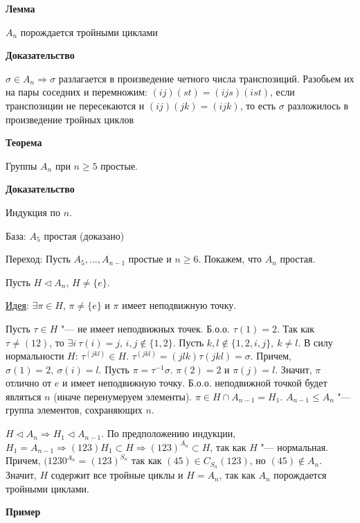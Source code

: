 \documentclass{article}
\begin{document}
\vspace{10pt}

\textbf{Лемма}

$A_n$ порождается тройными циклами  

\textbf{Доказательство}

$\sigma \in A_n \Rightarrow \sigma$ разлагается в произведение четного числа транспозиций. Разобьем их на пары соседних и перемножим: $(i j)(s t) = (i j s)(i s t)$, если транспозиции не пересекаются и $(i j)(j k) = (i j k)$, то есть $\sigma$ разложилось в произведение тройных циклов

\vspace{10pt}

\textbf{Теорема}

Группы $A_n$ при $n \geq 5$ простые.

\textbf{Доказательство}

Индукция по $n$.

База: $A_5$ простая (доказано)

Переход: Пусть $A_5, ..., A_{n-1}$ простые и $n \geq 6$. Покажем, что $A_n$ простая.

Пусть $H \triangleleft A_n$, $H \neq \{e\}$.

\underline{Идея}: $\exists \pi \in H$, $\pi \neq \{e\}$ и $\pi$ имеет неподвижную точку.

Пусть $\tau \in H$ "--- не имеет неподвижных точек. Б.о.о. $\tau(1) = 2$. Так как $\tau \neq (1 2)$, то $\exists i \  \tau(i) = j$, $i, j \notin \{1, 2\}$. Пусть $k, l \notin \{1, 2, i, j\}, \  k \neq l$. В силу нормальности $H$: $\tau^{(j k l)} \in H$. $\tau^{(j k l)} = (j l k)\tau(j k l) = \sigma$. Причем, $\sigma(1) = 2, \  \sigma(i) = l$. Пусть $\pi= \tau^{-1}\sigma$. $\pi(2) = 2$ и $\pi(j) = l$. Значит, $\pi$ отлично от $e$ и имеет неподвижную точку. Б.о.о. неподвижной точкой будет являться $n$ (иначе перенумеруем элементы). $\pi \in H \cap A_{n-1} = H_1$. $A_{n-1} \leq A_n$ "--- группа элементов, сохраняющих $n$.

$H \triangleleft A_n \Rightarrow H_1 \triangleleft A_{n-1}$. По предположению индукции, $H_1 = A_{n-1} \Rightarrow (1 2 3)H_1 \subset H \Rightarrow (1 2 3)^{A_n} \subset H$, так как $H$ "--- нормальная. Причем, $(1 2 30^{A_n} = (1 2 3)^{S_n}$ так как $(4 5) \in C_{S_n}(1 2 3)$, но $(4 5) \notin A_n$. Значит, $H$ содержит все тройные циклы и $H = A_n$, так как $A_n$ порождается тройными циклами.

\vspace{10pt}

\textbf{Пример}
\end{document}
